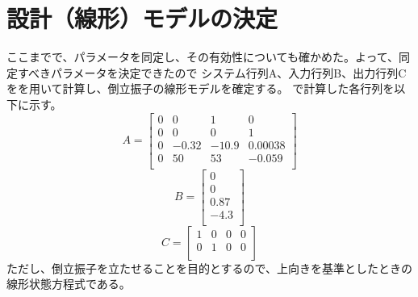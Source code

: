 \section{設計（線形）モデルの決定}
	ここまでで、パラメータを同定し、その有効性についても確かめた。よって、同定すべきパラメータを決定できたので
	システム行列A、入力行列B、出力行列Cを\MaTX{}を用いて計算し、倒立振子の線形モデルを確定する。
	\MaTX{}で計算した各行列を以下に示す。
	\begin{equation}
		A=\left[
		\begin{array}{cccc}
			0 & 0 & 1 & 0 \\
			0 & 0 & 0 & 1 \\
			0 & -0.32 & -10.9 & 0.00038 \\
			0 & 50 & 53 & -0.059 \\
		\end{array}
		\right]
	\end{equation}
	\begin{equation}
		B=\left[
		\begin{array}{c}
			0 \\
			0 \\
			0.87 \\
			-4.3 \\
		\end{array}
		\right]
	\end{equation}
	\begin{equation}
		C=\left[
		\begin{array}{cccc}
			1 & 0 & 0 & 0 \\
			0 & 1 & 0 & 0 \\
		\end{array}
		\right]
	\end{equation}
	ただし、倒立振子を立たせることを目的とするので、上向きを基準としたときの線形状態方程式である。